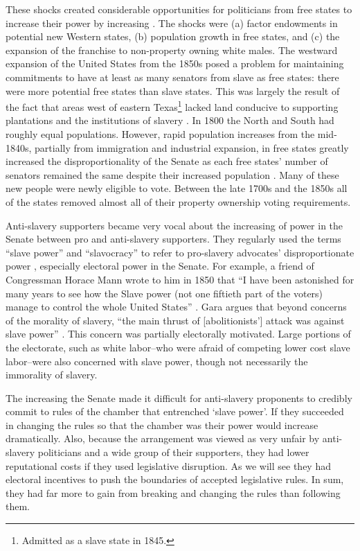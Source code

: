 \documentclass[a4paper]{article}\usepackage[]{graphicx}\usepackage[]{color}
\begin{document}
These shocks created considerable opportunities for politicians from free states to increase their power by increasing . The shocks were (a) factor endowments in potential new Western states, (b) population growth in free states, and (c) the expansion of the franchise to non-property owning white males. The westward expansion of the United States from the 1850s posed a problem for maintaining commitments to have at least as many senators from slave as free states: there were more potential free states than slave states. This was largely the result of the fact that areas west of eastern Texas\footnote{Admitted as a slave state in 1845.} lacked land conducive to supporting plantations and the institutions of slavery \cite[]{Ramsdell1929,Weingast1998}. In 1800 the North and South had roughly equal populations. However, rapid population increases from the mid-1840s, partially from immigration and industrial expansion, in free states greatly increased the disproportionality of the Senate as each free states' number of senators remained the same despite their increased population \cite[184]{Weingast1998}. Many of these new people were newly eligible to vote. Between the late 1700s and the 1850s all of the states removed almost all of their property ownership voting requirements.

Anti-slavery supporters became very vocal about the increasing  of power in the Senate between pro and anti-slavery supporters. They regularly used the terms ``slave power'' and ``slavocracy'' to refer to pro-slavery advocates' disproportionate power \citep{richards2000}, especially electoral power in the Senate. For example, a friend of Congressman Horace Mann wrote to him in 1850 that ``I have been astonished for many years to see how the Slave power (not one fiftieth part of the voters) manage to control the whole United States'' \citep[quoted in][6]{Gara1969}. Gara argues that beyond concerns of the morality of slavery, ``the main thrust of [abolitionists'] attack was against slave power'' \citeyearpar[6]{Gara1969}. This concern was partially electorally motivated. Large portions of the electorate, such as white labor--who were afraid of competing lower cost slave labor--were also concerned with slave power, though not necessarily the immorality of slavery.

The increasing  the Senate made it difficult for anti-slavery proponents to credibly commit to rules of the chamber that entrenched `slave power'. If they succeeded in changing the rules so that the chamber was  their power would increase dramatically. Also, because the arrangement was viewed as very unfair by anti-slavery politicians and a wide group of their supporters, they had lower reputational costs if they used legislative disruption. As we will see they had electoral incentives to push the boundaries of accepted legislative rules. In sum, they had far more to gain from breaking and changing the rules than following them.
\end{document}
